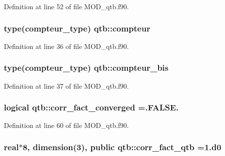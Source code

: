 Definition at line 52 of file M\-O\-D\-\_\-qtb.\-f90.

\hypertarget{classqtb_ab733e1c72aab6e2efbb6f73fe66a9bde}{
\subsubsection[{compteur}]{\setlength{\rightskip}{0pt plus 5cm}type(compteur\-\_\-type) qtb\-::compteur}}\label{classqtb_ab733e1c72aab6e2efbb6f73fe66a9bde}


Definition at line 36 of file M\-O\-D\-\_\-qtb.\-f90.

\hypertarget{classqtb_a02996b871c2484af286eac8a88a9bcbc}{
\subsubsection[{compteur\-\_\-bis}]{\setlength{\rightskip}{0pt plus 5cm}type(compteur\-\_\-type) qtb\-::compteur\-\_\-bis}}\label{classqtb_a02996b871c2484af286eac8a88a9bcbc}


Definition at line 37 of file M\-O\-D\-\_\-qtb.\-f90.

\hypertarget{classqtb_ac8edcb982290fc47e3bf05877f2b0ecc}{
\subsubsection[{corr\-\_\-fact\-\_\-converged}]{\setlength{\rightskip}{0pt plus 5cm}logical qtb\-::corr\-\_\-fact\-\_\-converged =.F\-A\-L\-S\-E.}}\label{classqtb_ac8edcb982290fc47e3bf05877f2b0ecc}


Definition at line 60 of file M\-O\-D\-\_\-qtb.\-f90.

\hypertarget{classqtb_a8d99876f7c7cb5436adea57579d89f7d}{
\subsubsection[{corr\-\_\-fact\-\_\-qtb}]{\setlength{\rightskip}{0pt plus 5cm}real$\ast$8, dimension(3), public qtb\-::corr\-\_\-fact\-\_\-qtb =1.d0}}\label{classqtb_a8d99876f7c7cb5436adea57579d89f7d}



